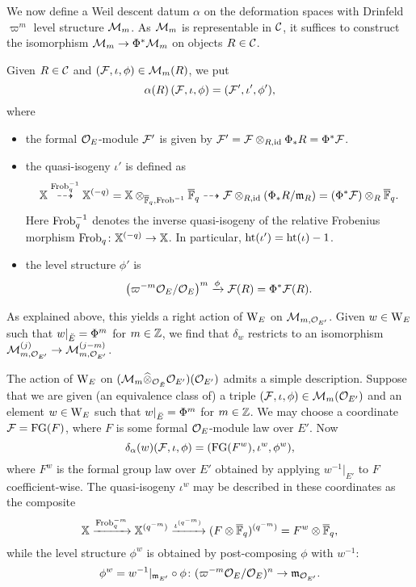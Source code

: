 \documentclass[../main.tex]{subfiles}
\begin{document}
We now define a Weil descent datum $\alpha$ on the deformation spaces with 
Drinfeld $\varpi^m$ level structure $\mathcal{M}_m$. As $\mathcal{M}_m$ is representable
in $\mathcal{C}$, it suffices to construct the isomorphism
$\mathcal{M}_m \to \Phi^* \mathcal{M}_m$ on objects $R \in \mathcal{C}$. 

Given $R\in \mathcal{C}$ and $(\mathcal{F}, \iota, \phi) \in \mathcal{M}_m(R)$, we put
\begin{equation*}
  \alpha(R) \left( \mathcal{F}, \iota, \phi \right) = (\mathcal{F}', \iota',\phi'),
\end{equation*}
where
\begin{itemize}
  \item the formal $\mathcal{O}_E$-module $\mathcal{F}'$ is given by $\mathcal{F}' = \mathcal{F} \otimes_{R,
    \operatorname{id}}
    \Phi_* R = \Phi^* \mathcal{F}$.
  \item the quasi-isogeny $\iota'$ is defined as
    \begin{equation*}
      \mathbb{X} \overset{\mathrm{Frob}_q^{-1}}{\dashrightarrow} \mathbb{X}^{(-q)} = \mathbb{X}
      \otimes_{\overline {\mathbb{F}}_q, \mathrm{Frob}^{-1}}
      {\overline {\mathbb{F}}_q} \dashrightarrow \mathcal{F} \otimes_{R, \operatorname{id}} (\Phi_* R/\mathfrak{m}_R) = (\Phi^*
      \mathcal{F}) \otimes_R {\overline {\mathbb{F}}_q}.
    \end{equation*}
    Here $\mathrm{Frob}_q^{-1}$ denotes the inverse quasi-isogeny of the relative Frobenius morphism $\mathrm{Frob}_q\colon \mathbb{X}^{(-q)} \to \mathbb{X}$. In particular, 
    $\textnormal{ht}(\iota') = \textnormal{ht}(\iota)-1$.
  \item the level structure $\phi'$ is
    \begin{equation*}
      \left({\varpi^{-m}\mathcal{O}_E}/{\mathcal{O}_E} \right)^m      
       \xrightarrow{\phi} \mathcal{F}(R) = \Phi^* \mathcal{F}(R).
    \end{equation*}
\end{itemize}

As explained above, this yields a right action of $\mathrm W_E$ on $\mathcal{M}_{m, \mathcal{O}_{{E'}}}$.
Given $w \in \mathrm W_E$ such that $w|_{\breve {E}} = \Phi^m$ for $m \in \mathbb{Z}$, we find
that $\delta_w$ restricts to an isomorphism $\mathcal{M}_{m, \mathcal{O}_{{E'}}}^{(j)} \to \mathcal{M}_{m,
\mathcal{O}_{{E'}}}^{(j-m)}$. 

\begin{xpl}
  The action of $\mathrm W_E$ on $(\mathcal{M}_{m}\widehat \otimes_{\mathcal{O}_{\breve {E}}}
  \mathcal{O}_{E'})({\mathcal{O}_{E'}})$ admits a simple description. Suppose that we are given (an
  equivalence class of) a triple $(\mathcal{F}, \iota, \phi) \in \mathcal{M}_m({\mathcal{O}_{E'}})$ and
  an element $w \in \mathrm W_E$ such that $w|_{{\breve {E}}} = \Phi^m$ for $m \in \mathbb{Z}$. We
  may choose a coordinate $\mathcal{F} = \textnormal{FG}(F)$, where $F$ is some formal
  $\mathcal{O}_E$-module law over $E'$. 
  Now $$\delta_\alpha(w)(\mathcal{F}, \iota, \phi) = (\textnormal{FG}(F^w), \iota^w, \phi^w),$$
  where $F^w$ is the formal group law over $E'$ obtained by
  applying $w^{-1}|_{E'}$ to $F$ coefficient-wise. The quasi-isogeny $\iota^w$ may
  be described in these coordinates as the composite $$ \mathbb{X} \xrightarrow{\mathrm{Frob}_q^{-m}}
  \mathbb{X}^{(q^{-m})} \xrightarrow{\iota^{(q^{-m})}} (F \otimes {\overline{\mathbb{F}}_q})^{(q^{-m})} = F^w \otimes
  {\overline{\mathbb{F}}_q},$$ while the level structure $\phi^w$ is obtained by post-composing
  $\phi$ with $w^{-1}$: $$\phi^w = w^{-1}|_{\mathfrak{m}_{E'}} \circ \phi \colon
  (\varpi^{-m}\mathcal{O}_E/\mathcal{O}_E)^n \to \mathfrak{m}_{\mathcal{O}_{E'}}.$$
\end{xpl}
\end{document}
